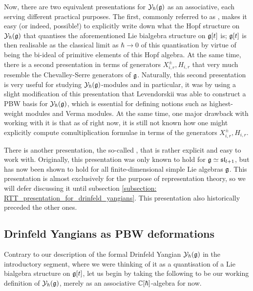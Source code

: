    Now, there are two equivalent presentations for $\mathcal{Y}_{\hbar}(\mathfrak{g})$ as an associative, each serving different practical purposes. The first, commonly referred to as , makes it easy (or indeed, possible!) to explicitly write down what the Hopf structure on $\mathcal{Y}_{\hbar}(\mathfrak{g})$ that quantises the aforementioned Lie bialgebra structure on $\mathfrak{g}[t]$ is; $\mathfrak{g}[t]$ is then realisable as the classical limit as $\hbar \to 0$ of this quantisation by virtue of being the bi-ideal of primitive elements of this Hopf algebra. At the same time, there is a second presentation in terms of generators $X_{i, r}^{\pm}, H_{i, r}$ that very much resemble the Chevalley-Serre generators of $\mathfrak{g}$. Naturally, this second presentation is very useful for studying $\mathcal{Y}_{\hbar}(\mathfrak{g})$-modules and in particular, it was by using a slight modification of this presentation that Levendorskii was able to construct a PBW basis for $\mathcal{Y}_{\hbar}(\mathfrak{g})$, which is essential for defining notions such as highest-weight modules and Verma modules. At the same time, one major drawback with working with it is that as of right now, it is still not known how one might explicitly compute comultiplication formulae in terms of the generators $X_{i, r}^{\pm}, H_{i, r}$. 

    There is another presentation, the so-called , that is rather explicit and easy to work with. Originally, this presentation was only known to hold for $\mathfrak{g} \simeq \mathfrak{sl}_{l + 1}$, but has now been shown to hold for all finite-dimensional simple Lie algebras $\mathfrak{g}$. This presentation is almost exclusively for the purpose of representation theory, so we will defer discussing it until subsection \ref{subsection: RTT_presentation_for_drinfeld_yangians}. This presentation also historically preceded the other ones.

    \subsection{Drinfeld Yangians as PBW deformations}
        Contrary to our description of the formal Drinfeld Yangian $\mathcal{Y}_{\hbar}(\mathfrak{g})$ in the introductory segment, where we were thinking of it as a quantisation of a Lie bialgebra structure on $\mathfrak{g}[t]$, let us begin by taking the following to be our working definition of $\mathcal{Y}_{\hbar}(\mathfrak{g})$, merely as an associative $\mathbb{C}[\hbar]$-algebra for now.

